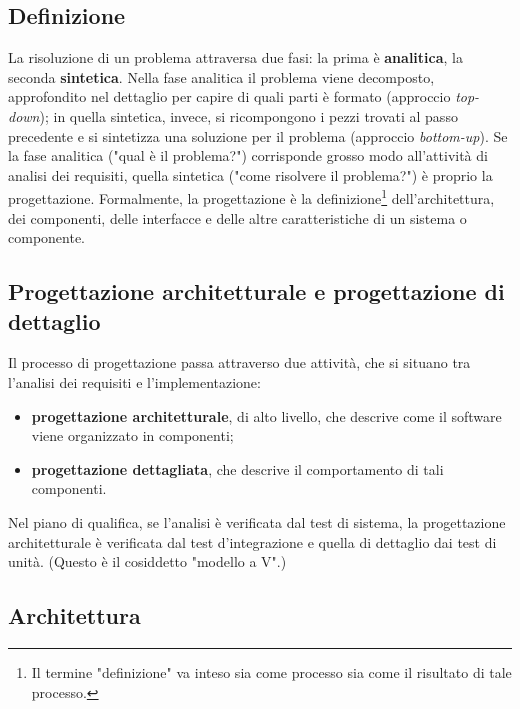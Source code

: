 \documentclass[a4paper]{article}
\begin{document}
		
	\subsection{Definizione}

		
La risoluzione di un problema attraversa due fasi: la prima è \textbf{analitica}, la seconda \textbf{sintetica}. Nella fase analitica il problema viene decomposto, approfondito nel dettaglio per capire di quali parti è formato (approccio \emph{top-down}); in quella sintetica, invece, si ricompongono i pezzi trovati al passo precedente e si sintetizza una soluzione per il problema (approccio \emph{bottom-up}). Se la fase analitica ("qual è il problema?") corrisponde grosso modo all'attività di analisi dei requisiti, quella sintetica ("come risolvere il problema?") è proprio la progettazione. Formalmente, la progettazione è la definizione\footnote{Il termine "definizione" va inteso sia come processo sia come il risultato di tale processo.} dell'architettura, dei componenti, delle interfacce e delle altre caratteristiche di un sistema o componente.

		
	\subsection{Progettazione architetturale e progettazione di dettaglio}

		
Il processo di progettazione passa attraverso due attività, che si situano tra l'analisi dei requisiti e l'implementazione:
		
	\begin{itemize}
		
			
	\item \textbf{progettazione architetturale}, di alto livello, che descrive come il software viene organizzato in componenti;
			
	\item \textbf{progettazione dettagliata}, che descrive il comportamento di tali componenti.
		
	\end{itemize}

		
Nel piano di qualifica, se l'analisi è verificata  dal test di sistema, la progettazione architetturale è verificata dal test d'integrazione e quella di dettaglio dai test di unità. (Questo è il cosiddetto "modello a V".)

		
	\subsection{Architettura}
\end{document}
